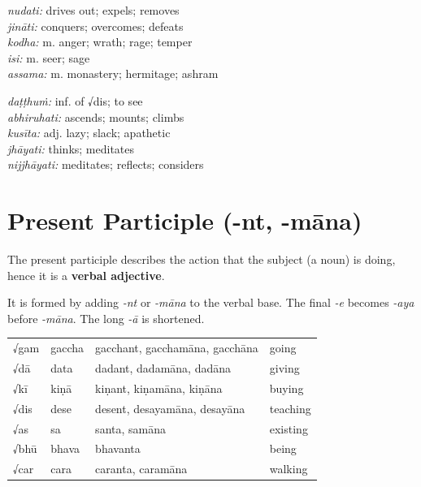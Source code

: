 \documentclass[11pt,oneside]{memoir}
\begin{document}
\normalArrayStrech

\bigskip

\begin{twocols}
\emph{nudati:} drives out; expels; removes\\[0pt]
\emph{jināti:} conquers; overcomes; defeats\\[0pt]
\emph{kodha:} m. anger; wrath; rage; temper\\[0pt]
\emph{isi:} m. seer; sage\\[0pt]
\emph{assama:} m.  monastery; hermitage; ashram\\[0pt]

\columnbreak

\emph{daṭṭhuṁ:} inf. of √dis; to see\\[0pt]
\emph{abhiruhati:} ascends; mounts; climbs\\[0pt]
\emph{kusīta:} adj. lazy; slack; apathetic\\[0pt]
\emph{jhāyati:} thinks; meditates\\[0pt]
\emph{nijjhāyati:} meditates; reflects; considers
\end{twocols}

\clearpage

\section{Present Participle (-nt, -māna)}
\label{sec:orgef764df}

The present participle describes the action that the subject (a noun) is doing, hence it is a \textbf{verbal adjective}.

It is formed by adding \emph{-nt} or \emph{-māna} to the verbal base.
The final \emph{-e} becomes \emph{-aya} before \emph{-māna}. The long \emph{-ā} is shortened.

\begin{center}
\begin{tabular}{llll}
√gam & gaccha & gacchant, gacchamāna, gacchāna & going\\[0pt]
√dā & data & dadant, dadamāna, dadāna & giving\\[0pt]
√kī & kiṇā & kiṇant, kiṇamāna, kiṇāna & buying\\[0pt]
√dis & dese & desent, desayamāna, desayāna & teaching\\[0pt]
√as & sa & santa, samāna & existing\\[0pt]
√bhū & bhava & bhavanta & being\\[0pt]
√car & cara & caranta, caramāna & walking\\[0pt]
\end{tabular}
\end{center}
\end{document}

